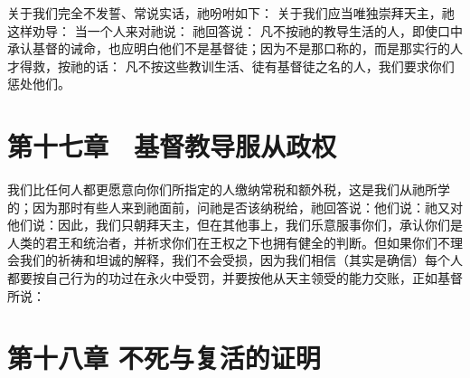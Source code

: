 关于我们完全不发誓、常说实话，祂吩咐如下：  关于我们应当唯独崇拜天主，祂这样劝导：  当一个人来对祂说： 祂回答说：  凡不按祂的教导生活的人，即使口中承认基督的诫命，也应明白他们不是基督徒；因为不是那口称的，而是那实行的人才得救，按祂的话： 凡不按这些教训生活、徒有基督徒之名的人，我们要求你们惩处他们。\par


\section{第十七章　基督教导服从政权}

我们比任何人都更愿意向你们所指定的人缴纳常税和额外税，这是我们从祂所学的；因为那时有些人来到祂面前，问祂是否该纳税给，祂回答说：他们说：祂又对他们说：因此，我们只朝拜天主，但在其他事上，我们乐意服事你们，承认你们是人类的君王和统治者，并祈求你们在王权之下也拥有健全的判断。但如果你们不理会我们的祈祷和坦诚的解释，我们不会受损，因为我们相信（其实是确信）每个人都要按自己行为的功过在永火中受罚，并要按他从天主领受的能力交账，正如基督所说：\par


\section{第十八章 不死与复活的证明}

